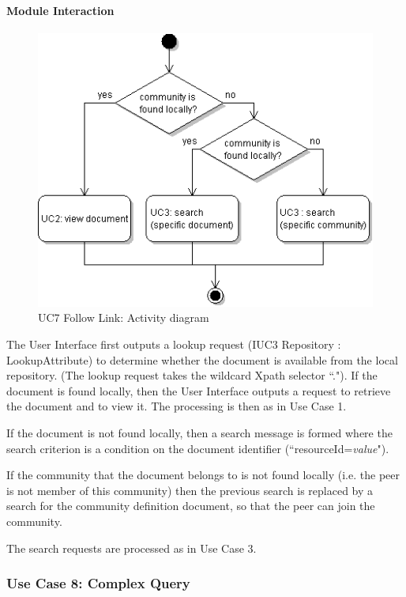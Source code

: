 \documentclass[titlepage]{article}%
\begin{document}
\paragraph{Module Interaction}
\begin{figure}[htb]
\centering
	\includegraphics[scale=0.5]{diagrams/uc7-followlink.png}
	\caption{UC7 Follow Link: Activity diagram}
	\label{fig:uc7}
\end{figure}

The User Interface first outputs a lookup request (IUC3 Repository : LookupAttribute) to determine whether the document is available from the local repository. (The lookup request takes the wildcard Xpath selector ``.").
If the document is found locally, then the User Interface outputs a request to retrieve the document and to view it. The processing is then as in Use Case 1.

If the document is not found locally, then a search message is formed where the search criterion is a condition on the document identifier (``resourceId=\emph{value}").

If the community that the document belongs to is not found locally (i.e. the peer is not member of this community) then the previous search is replaced by a search for the community definition document, so that the peer can join the community.

The search requests are processed as in Use Case 3.

\subsubsection{Use Case 8: Complex Query } 
\end{document}
